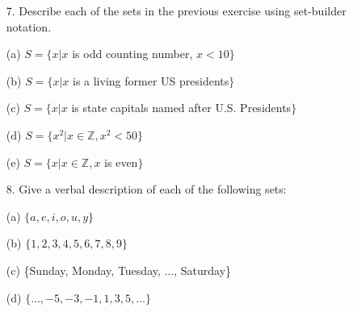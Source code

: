 \documentclass{article}
\begin{document}
\begin{itemize}
    (c) The set of all U.S. state capitals that were named for U.S. presidents\\
    
    (d) The set of all square numbers less than 50\\
    
    (e) The set of all even counting numbers\\
    
    \item[7.] Describe each of the sets in the previous exercise using set-builder notation.
    
    (a) {\color{blue} $S = \{x|x$ is odd counting number, $x <10\}$}
    
    (b) {\color{blue} $S = \{x|x$ is a living former US presidents$\}$}
    
    (c) {\color{blue} $S = \{x|x$ is state capitals named after U.S. Presidents$\}$}
    
    (d) {\color{blue} $S = \{x^2|x\in\mathbb{Z}, x^2 < 50\}$}
    
    (e) {\color{blue} $S = \{x|x\in\mathbb{Z}, x$ is even$\}$}
    
    \item[8.] Give a verbal description of each of the following sets:
    
    (a) $\{a, e, i, o, u, y\}$\\
    
    (b) $\{1,2,3,4,5,6,7,8,9\}$\\
    
    (c) \{Sunday, Monday, Tuesday, ..., Saturday\}\\
    
    (d) $\{..., -5, -3, -1, 1, 3, 5, ...\}$\\
    

\end{itemize}
\end{document}
